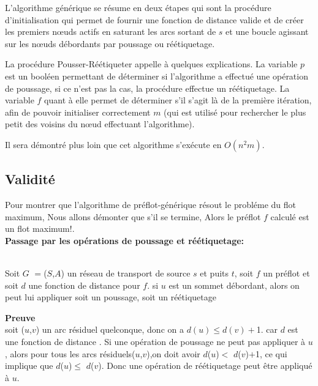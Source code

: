L'algorithme générique se résume en deux étapes qui sont la procédure d'initialisation qui permet de
fournir une fonction de distance valide et de créer les premiers n\oe uds actifs en saturant les
arcs sortant de $s$ et une boucle agissant sur les n\oe uds débordants par poussage ou réétiquetage.




La procédure Pousser-Réétiqueter appelle à quelques explications. La variable $p$ est un booléen
permettant de déterminer si l'algorithme a effectué une opération de poussage, si ce n'est pas la
cas, la procédure effectue un réétiquetage. La variable $f$ quant à elle permet de déterminer s'il
s'agit là de la première itération, afin de pouvoir initialiser correctement $m$ (qui est utilisé
pour rechercher le plus petit des voisins du n\oe ud effectuant l'algorithme).



Il sera démontré plus loin que cet algorithme s'exécute en $O(n^2m)$.

\subsection{Validité}

Pour montrer que l'algorithme de préflot-générique résout le probléme du flot maximum, Nous allons démonter que s'il se termine, Alors le préflot $f$ calculé est un flot maximum!.\\

\textbf{Passage par les opérations de poussage et réétiquetage:}  
\begin{lemma} ~\\
	\label{increase_distance}Soit $G$ $=$($S$,$A$) un réseau de transport de source $s$ et puits $t$, soit $f$ un préflot et 
  soit $d$ une fonction  de distance  pour $f$. si $u$ est un sommet débordant, alors on peut lui appliquer soit un poussage, soit un réétiquetage  
\end{lemma}   
\textbf{Preuve} \\
soit ($u$,$v$) un arc résiduel quelconque, donc on a $d(u)\leq d(v)+$1. car $d$ est une fonction  de distance .  Si une opération de poussage ne peut pas appliquer à $u$, alors pour tous les arcs résiduels($u$,$v$),on doit avoir $d$($u$)$<$ $d$($v$)$+$1, ce qui implique que $d$($u$)$\leq$ $d$($v$). Donc une opération de réétiquetage peut être appliqué à $u$.\\                        

